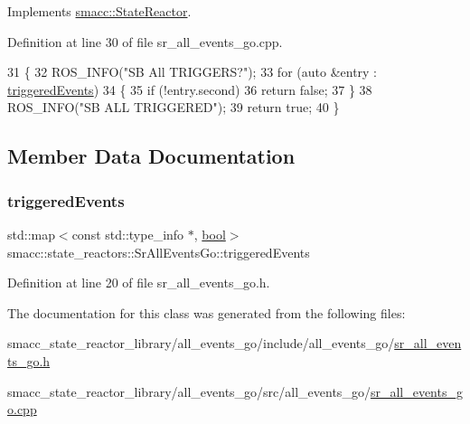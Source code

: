 Implements \hyperlink{classsmacc_1_1StateReactor_a445bc3c90980d75d7d815b85cfb68b21}{smacc\+::\+State\+Reactor}.



Definition at line 30 of file sr\+\_\+all\+\_\+events\+\_\+go.\+cpp.


\begin{DoxyCode}
31 \{
32     ROS\_INFO(\textcolor{stringliteral}{"SB All TRIGGERS?"});
33     \textcolor{keywordflow}{for} (\textcolor{keyword}{auto} &entry : \hyperlink{classsmacc_1_1state__reactors_1_1SrAllEventsGo_a2c3d7c7e15ed155ae6e83fe49e7897e9}{triggeredEvents})
34     \{
35         \textcolor{keywordflow}{if} (!entry.second)
36             \textcolor{keywordflow}{return} \textcolor{keyword}{false};
37     \}
38     ROS\_INFO(\textcolor{stringliteral}{"SB ALL TRIGGERED"});
39     \textcolor{keywordflow}{return} \textcolor{keyword}{true};
40 \}
\end{DoxyCode}


\subsection{Member Data Documentation}
\mbox{\label{classsmacc_1_1state__reactors_1_1SrAllEventsGo_a2c3d7c7e15ed155ae6e83fe49e7897e9}} 
\subsubsection{\texorpdfstring{triggered\+Events}{triggeredEvents}}
{\footnotesize\ttfamily std\+::map$<$const std\+::type\+\_\+info $\ast$, \hyperlink{classbool}{bool}$>$ smacc\+::state\+\_\+reactors\+::\+Sr\+All\+Events\+Go\+::triggered\+Events\hspace{0.3cm}{\ttfamily [private]}}



Definition at line 20 of file sr\+\_\+all\+\_\+events\+\_\+go.\+h.



The documentation for this class was generated from the following files\+:\begin{DoxyCompactItemize}
\item 
smacc\+\_\+state\+\_\+reactor\+\_\+library/all\+\_\+events\+\_\+go/include/all\+\_\+events\+\_\+go/\hyperlink{sr__all__events__go_8h}{sr\+\_\+all\+\_\+events\+\_\+go.\+h}\item 
smacc\+\_\+state\+\_\+reactor\+\_\+library/all\+\_\+events\+\_\+go/src/all\+\_\+events\+\_\+go/\hyperlink{sr__all__events__go_8cpp}{sr\+\_\+all\+\_\+events\+\_\+go.\+cpp}\end{DoxyCompactItemize}
